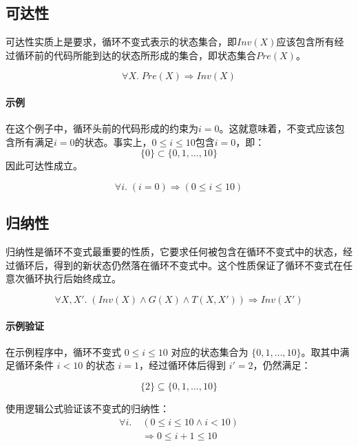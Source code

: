 \subsection*{可达性}
可达性实质上是要求，循环不变式表示的状态集合，即$\mathit{Inv}(X)$应该包含所有经过循环前的代码所能到达的状态所形成的集合，即状态集合$\mathit{Pre}(X)$。

\begin{equation}
\forall X.\; \mathit{Pre}(X) \Rightarrow \mathit{Inv}(X)
\end{equation}

\paragraph{示例}
在这个例子中，循环头前的代码形成的约束为$i = 0$。这就意味着，不变式应该包含所有满足$i = 0$的状态。事实上，$0 \leq i \leq 10$包含$i = 0$，即：
$$
\{0\} \subset \{0, 1, \ldots, 10\}
$$
因此可达性成立。

\begin{equation}
\forall i.\; (i = 0) \Rightarrow (0 \leq i \leq 10)
\end{equation}

\subsection*{归纳性}
归纳性是循环不变式最重要的性质，它要求任何被包含在循环不变式中的状态，经过循环后，得到的新状态仍然落在循环不变式中。这个性质保证了循环不变式在任意次循环执行后始终成立。

\begin{equation}
\forall X,X'.\; \left( \mathit{Inv}(X) \land G(X) \land T(X,X') \right) \Rightarrow \mathit{Inv}(X')
\end{equation}

\paragraph{示例验证}
在示例程序中，循环不变式 $0 \leq i \leq 10$ 对应的状态集合为 $\{0,1,\ldots,10\}$。取其中满足循环条件 $i<10$ 的状态 $i=1$，经过循环体后得到 $i'=2$，仍然满足：

$$
\{2\} \subseteq \{0,1,\ldots,10\}
$$

使用逻辑公式验证该不变式的归纳性：
\begin{align*}
\forall i.\; &(0 \leq i \leq 10 \land i < 10) \\
&\Rightarrow 0 \leq i+1 \leq 10
\end{align*}

